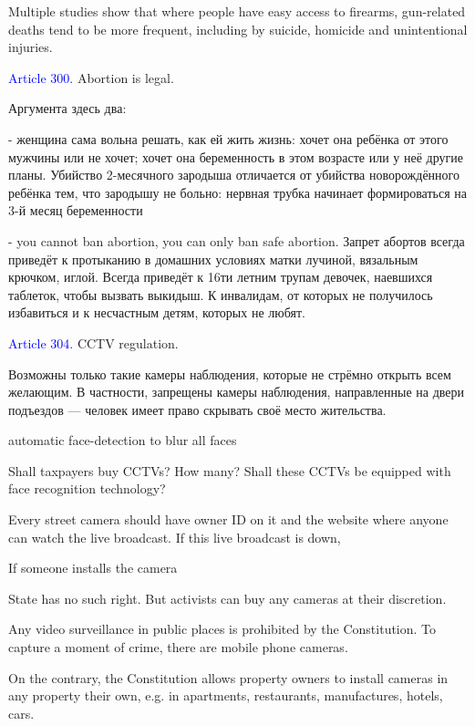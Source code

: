\documentclass[11pt]{article}
\theoremstyle{remark}
\theoremstyle{definition}
\begin{document}
Multiple studies show that where people have easy access to firearms, gun-related deaths tend to be more frequent, including by suicide, homicide and unintentional injuries.


\textcolor{blue}{Article 300.} Abortion is legal.


\color{blue}

Аргумента здесь два:

- женщина сама вольна решать, как ей жить жизнь: хочет она ребёнка от этого мужчины или не хочет; хочет она беременность в этом возрасте или у неё другие планы. Убийство 2-месячного зародыша отличается от убийства новорождённого ребёнка тем, что зародышу не больно: нервная трубка начинает формироваться на 3-й месяц беременности

- you cannot ban abortion, you can only ban safe abortion. Запрет абортов всегда приведёт к протыканию в домашних условиях матки лучиной, вязальным крючком, иглой. Всегда приведёт к 16ти летним трупам девочек, наевшихся таблеток, чтобы вызвать выкидыш. К инвалидам, от которых не получилось избавиться и к несчастным детям, которых не любят.






\color{black}



\textcolor{blue}{Article 304.} CCTV regulation.

\color{blue}

Возможны только такие камеры наблюдения, которые не стрёмно открыть всем желающим. В частности, запрещены камеры наблюдения, направленные на двери подъездов --- человек имеет право скрывать своё место жительства.


automatic face-detection to blur all faces

Shall taxpayers buy CCTVs? How many? Shall these CCTVs be equipped with face recognition technology?

Every street camera should have owner ID on it and the website where anyone can watch the live broadcast. If this live broadcast is down,

If someone installs the camera

State has no such right. But activists can buy any cameras at their discretion.

Any video surveillance in public places is prohibited by the Constitution. To capture a moment of crime, there are mobile phone cameras.

On the contrary, the Constitution allows property owners to install cameras in any property their own, e.g. in apartments, restaurants, manufactures, hotels, cars. 
\end{document}
